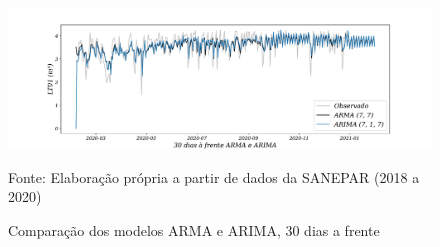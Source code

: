 \begin{figure}[H]
	\centering
	\caption{Comparação dos modelos ARMA e ARIMA, 30 dias a frente }
	\label{fig:60-ARMA-ARIMA24}
	\includegraphics[width=1\linewidth]{Apendices/Figuras/modelagem-24h/30-ARMA-ARIMA}
	
Fonte: Elaboração própria a partir de dados da SANEPAR (2018 a 2020)
\end{figure}